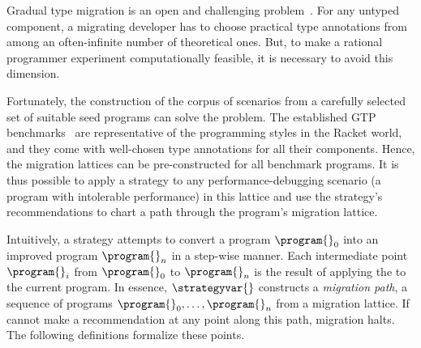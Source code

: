 \newcommand{\gtpurl}{\url{https://docs.racket-lang.org/gtp-benchmarks/index.html}}

Gradual type migration is an open and challenging problem~\cite{rch:in-out-infer-gt, km:ts-type-evo,
mp:gt-decidable, ccew:gt-migrate, gc:gt-infer,
cagg-solver-based-migration,clps-popl-2020,js-infer,ruby-static-infer,unif-infer,
msi:gt-infer-hm,dyn-infer-ruby,profile-guided-typing,jstrace,gen-ts-decl,
lambdanet,nl2ptype,learn-types-big-data,ml-ts, ccw-icfp-2018}.
For any untyped component, a migrating developer has to choose
practical type annotations from among an often-infinite number of theoretical
ones. But, to make a rational programmer experiment computationally feasible, it
is necessary to avoid this dimension.

Fortunately, the construction of the corpus of scenarios from a carefully
selected set of suitable seed programs can solve the problem.
The established GTP
benchmarks~\cite{gtnffvf-jfp-2019,g-rep-2023} are
representative of the programming styles in the Racket world, and they
come with well-chosen type annotations for all their components.  Hence,
the migration lattices can be pre-constructed for all benchmark programs.
It is thus possible to apply a strategy to any performance-debugging
scenario (a program with intolerable performance) in this lattice and
use the strategy's recommendations
to chart a path through the program's migration lattice.

Intuitively, a strategy \strategyvar{} attempts to convert a program $\program{}_0$
into an improved program $\program{}_n$ in  a step-wise manner.
Each intermediate point $\program{}_i$ from $\program{}_0$ to
$\program{}_n$ is the result of applying the \strategyvar{}
to the current program.
In essence,
$\strategyvar{}$ constructs a \emph{migration path}, a sequence of
programs ${\program{}_0}, \ldots, {\program{}_n}$ from a migration
lattice. If \strategyvar{} cannot make a recommendation at any point along
this path, migration halts.
The following definitions formalize these points.

